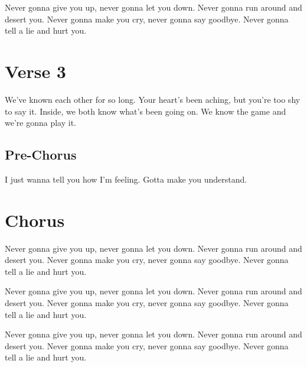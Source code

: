 \documentclass{article}
\begin{document}
Never gonna give you up, never gonna let you down.
Never gonna run around and desert you.
Never gonna make you cry, never gonna say goodbye.
Never gonna tell a lie and hurt you.

\section{Verse 3}

We've known each other for so long.
Your heart's been aching, but you're too shy to say it.
Inside, we both know what's been going on.
We know the game and we're gonna play it.

\subsection{Pre-Chorus}

I just wanna tell you how I'm feeling.
Gotta make you understand.

\section{Chorus}

Never gonna give you up, never gonna let you down.
Never gonna run around and desert you.
Never gonna make you cry, never gonna say goodbye.
Never gonna tell a lie and hurt you.

Never gonna give you up, never gonna let you down.
Never gonna run around and desert you.
Never gonna make you cry, never gonna say goodbye.
Never gonna tell a lie and hurt you.

Never gonna give you up, never gonna let you down.
Never gonna run around and desert you.
Never gonna make you cry, never gonna say goodbye.
Never gonna tell a lie and hurt you.
\end{document}
